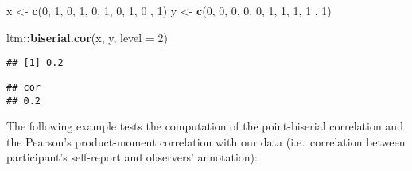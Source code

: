 \documentclass[]{article}
\newenvironment{Shaded}{\begin{snugshade}}{\end{snugshade}}
\newcommand{\DataTypeTok}[1]{\textcolor[rgb]{0.13,0.29,0.53}{#1}}
\newcommand{\DecValTok}[1]{\textcolor[rgb]{0.00,0.00,0.81}{#1}}
\newcommand{\KeywordTok}[1]{\textcolor[rgb]{0.13,0.29,0.53}{\textbf{#1}}}
\newcommand{\NormalTok}[1]{#1}
\newcommand{\OperatorTok}[1]{\textcolor[rgb]{0.81,0.36,0.00}{\textbf{#1}}}
\newcommand{\StringTok}[1]{\textcolor[rgb]{0.31,0.60,0.02}{#1}}
\begin{document}
\begin{Shaded}
\begin{Highlighting}[]
\NormalTok{x \textless{}{-}}\StringTok{ }\KeywordTok{c}\NormalTok{(}\DecValTok{0}\NormalTok{, }\DecValTok{1}\NormalTok{, }\DecValTok{0}\NormalTok{, }\DecValTok{1}\NormalTok{, }\DecValTok{0}\NormalTok{, }\DecValTok{1}\NormalTok{, }\DecValTok{0}\NormalTok{, }\DecValTok{1}\NormalTok{, }\DecValTok{0}\NormalTok{ , }\DecValTok{1}\NormalTok{)}
\NormalTok{y \textless{}{-}}\StringTok{ }\KeywordTok{c}\NormalTok{(}\DecValTok{0}\NormalTok{, }\DecValTok{0}\NormalTok{, }\DecValTok{0}\NormalTok{, }\DecValTok{0}\NormalTok{, }\DecValTok{0}\NormalTok{, }\DecValTok{1}\NormalTok{, }\DecValTok{1}\NormalTok{, }\DecValTok{1}\NormalTok{, }\DecValTok{1}\NormalTok{ , }\DecValTok{1}\NormalTok{)}

\NormalTok{ltm}\OperatorTok{::}\KeywordTok{biserial.cor}\NormalTok{(x, y, }\DataTypeTok{level =} \DecValTok{2}\NormalTok{)}
\end{Highlighting}
\end{Shaded}

\begin{verbatim}
## [1] 0.2
\end{verbatim}

\begin{Shaded}
\end{Shaded}

\begin{verbatim}
## cor 
## 0.2
\end{verbatim}

The following example tests the computation of the point-biserial correlation and the Pearson's product-moment correlation with our data (i.e.~correlation between participant's self-report and observers' annotation):

\begin{Shaded}
\end{Shaded}
\end{document}
